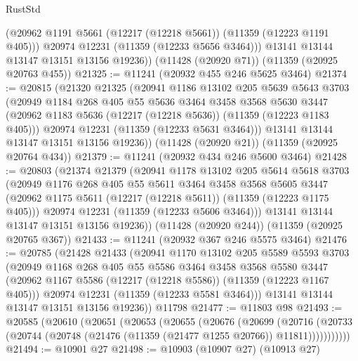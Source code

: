 \begin{lexlean}{RustStd}
\begin{coremodule}
{{{{{{{{{{{{{{{{{{{          (@20962 @1191 @5661 (@12217 (@12218 @5661)) (@11359 (@12223 @1191 @405)))
          @20974
          @12231
          (@11359 (@12233 @5656 @3464)))
        @13141
        @13144
        @13147
        @13151
        @13156
        @19236))
    (@11428 (@20920 @71))
    (@11359 (@20925 @20763 @455))
@21325 := @11241 (@20932 @455 @246 @5625 @3464)
@21374 := @20815
    (@21320
      @21325
      (@20941
        @1186
        @13102
        @205
        @5639
        @5643
        @3703
        (@20949
          @1184
          @268
          @405
          @55
          @5636
          @3464
          @3458
          @3568
          @5630
          @3447
          (@20962 @1183 @5636 (@12217 (@12218 @5636)) (@11359 (@12223 @1183 @405)))
          @20974
          @12231
          (@11359 (@12233 @5631 @3464)))
        @13141
        @13144
        @13147
        @13151
        @13156
        @19236))
    (@11428 (@20920 @21))
    (@11359 (@20925 @20764 @434))
@21379 := @11241 (@20932 @434 @246 @5600 @3464)
@21428 := @20803
    (@21374
      @21379
      (@20941
        @1178
        @13102
        @205
        @5614
        @5618
        @3703
        (@20949
          @1176
          @268
          @405
          @55
          @5611
          @3464
          @3458
          @3568
          @5605
          @3447
          (@20962 @1175 @5611 (@12217 (@12218 @5611)) (@11359 (@12223 @1175 @405)))
          @20974
          @12231
          (@11359 (@12233 @5606 @3464)))
        @13141
        @13144
        @13147
        @13151
        @13156
        @19236))
    (@11428 (@20920 @244))
    (@11359 (@20925 @20765 @367))
@21433 := @11241 (@20932 @367 @246 @5575 @3464)
@21476 := @20785
    (@21428
      @21433
      (@20941
        @1170
        @13102
        @205
        @5589
        @5593
        @3703
        (@20949
          @1168
          @268
          @405
          @55
          @5586
          @3464
          @3458
          @3568
          @5580
          @3447
          (@20962 @1167 @5586 (@12217 (@12218 @5586)) (@11359 (@12223 @1167 @405)))
          @20974
          @12231
          (@11359 (@12233 @5581 @3464)))
        @13141
        @13144
        @13147
        @13151
        @13156
        @19236))
    @11798
@21477 := @11803 @98
@21493 := @20585
    (@20610
      (@20651
        (@20653
          (@20655
            (@20676
              (@20699
                (@20716
                  (@20733 (@20744 (@20748 (@21476 (@11359 (@21477 @1255 @20766)) @11811)))))))))))
@21494 := @10901 @27
@21498 := @10903 (@10907 @27) (@10913 @27)
}}}}}}}}}}}}}}}}}}}
\end{coremodule}
\end{lexlean}
